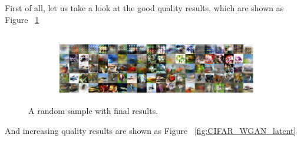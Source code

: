 \documentclass[12pt,letterpaper]{article}
\begin{document}
First of all, let us take a look at the good quality results, which are shown as Figure ~\ref{fig:CIFAR_WGAN_latent_results} 
\begin{figure}[h]
    \centering
    \includegraphics[width=.8\linewidth]{WGAN_CIFAR_0_50_256.png}
    \caption{\small A random sample with final results.}
    \label{fig:CIFAR_WGAN_latent_results}
\end{figure}

And increasing quality results are shown as Figure ~\ref{fig:CIFAR_WGAN_latent}
\end{document}
